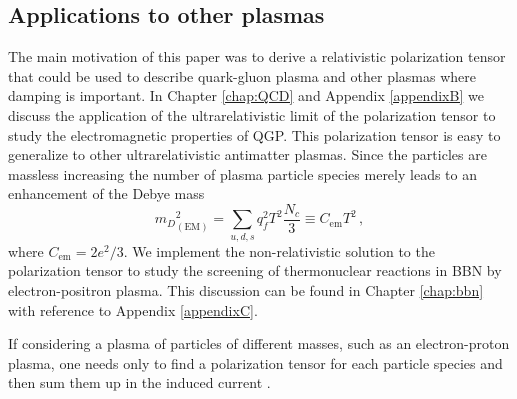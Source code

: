\subsection{Applications to other plasmas}
The main motivation of this paper was to derive a relativistic polarization tensor that could be used to describe quark-gluon plasma and other plasmas where damping is important. In Chapter \ref{chap:QCD} and Appendix \ref{appendixB} we discuss the application of the ultrarelativistic limit of the polarization tensor to study the electromagnetic properties of QGP. This polarization tensor is easy to generalize to other ultrarelativistic antimatter plasmas. Since the particles are massless increasing the number of plasma particle species merely leads to an enhancement of the Debye mass \cite{Grayson:2022asf,Kapusta:1992fm}
\begin{equation}\label{eq:Debyem}
    {m_D}^2_{(\text{EM})} = \sum_{u,d,s} q^2_f T^2 \frac{N_c}{3} \equiv C_{\text{em}}T^2\,,
\end{equation}
where $C_{\text{em}} =  2e^2/3$. We implement the non-relativistic solution to the polarization tensor to study the screening of thermonuclear reactions in BBN by electron-positron plasma. This discussion can be found in Chapter \ref{chap:bbn} with reference to Appendix \ref{appendixC}.

If considering a plasma of particles of different masses, such as an electron-proton plasma, one needs only to find a polarization tensor for each particle species and then sum them up in the induced current .

